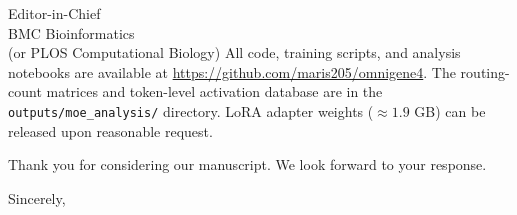 \documentclass[11pt]{letter}
\begin{document}
\begin{letter}{Editor-in-Chief\\
BMC Bioinformatics\\
(or PLOS Computational Biology)}
All code, training scripts, and analysis notebooks are available at \url{https://github.com/maris205/omnigene4}. The routing-count matrices and token-level activation database are in the \texttt{outputs/moe\_analysis/} directory. LoRA adapter weights ($\approx 1.9$ GB) can be released upon reasonable request.

\vspace{1em}

Thank you for considering our manuscript. We look forward to your response.

\closing{Sincerely,}

\end{letter}
\end{document}
